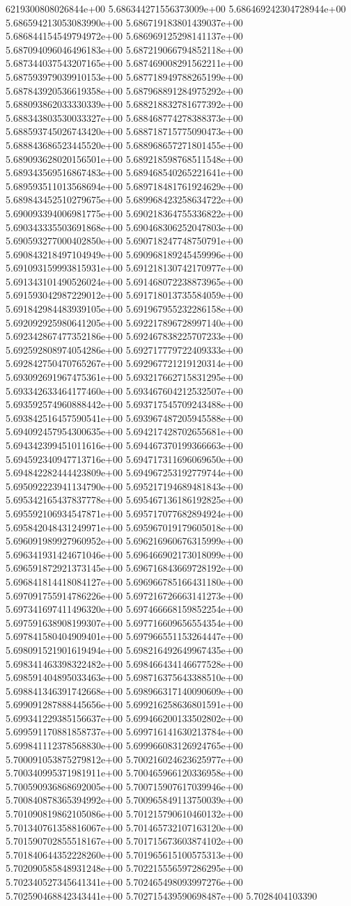 6219300808026844e+00	5.686344271556373009e+00	5.686469242304728944e+00	5.686594213053083990e+00	5.686719183801439037e+00	5.686844154549794972e+00	5.686969125298141137e+00	5.687094096046496183e+00	5.687219066794852118e+00	5.687344037543207165e+00	5.687469008291562211e+00	5.687593979039910153e+00	5.687718949788265199e+00	5.687843920536619358e+00	5.687968891284975292e+00	5.688093862033330339e+00	5.688218832781677392e+00	5.688343803530033327e+00	5.688468774278388373e+00	5.688593745026743420e+00	5.688718715775090473e+00	5.688843686523445520e+00	5.688968657271801455e+00	5.689093628020156501e+00	5.689218598768511548e+00	5.689343569516867483e+00	5.689468540265221641e+00	5.689593511013568694e+00	5.689718481761924629e+00	5.689843452510279675e+00	5.689968423258634722e+00	5.690093394006981775e+00	5.690218364755336822e+00	5.690343335503691868e+00	5.690468306252047803e+00	5.690593277000402850e+00	5.690718247748750791e+00	5.690843218497104949e+00	5.690968189245459996e+00	5.691093159993815931e+00	5.691218130742170977e+00	5.691343101490526024e+00	5.691468072238873965e+00	5.691593042987229012e+00	5.691718013735584059e+00	5.691842984483939105e+00	5.691967955232286158e+00	5.692092925980641205e+00	5.692217896728997140e+00	5.692342867477352186e+00	5.692467838225707233e+00	5.692592808974054286e+00	5.692717779722409333e+00	5.692842750470765267e+00	5.692967721219120314e+00	5.693092691967475361e+00	5.693217662715831295e+00	5.693342633464177460e+00	5.693467604212532507e+00	5.693592574960888442e+00	5.693717545709243488e+00	5.693842516457590541e+00	5.693967487205945588e+00	5.694092457954300635e+00	5.694217428702655681e+00	5.694342399451011616e+00	5.694467370199366663e+00	5.694592340947713716e+00	5.694717311696069650e+00	5.694842282444423809e+00	5.694967253192779744e+00	5.695092223941134790e+00	5.695217194689481843e+00	5.695342165437837778e+00	5.695467136186192825e+00	5.695592106934547871e+00	5.695717077682894924e+00	5.695842048431249971e+00	5.695967019179605018e+00	5.696091989927960952e+00	5.696216960676315999e+00	5.696341931424671046e+00	5.696466902173018099e+00	5.696591872921373145e+00	5.696716843669728192e+00	5.696841814418084127e+00	5.696966785166431180e+00	5.697091755914786226e+00	5.697216726663141273e+00	5.697341697411496320e+00	5.697466668159852254e+00	5.697591638908199307e+00	5.697716609656554354e+00	5.697841580404909401e+00	5.697966551153264447e+00	5.698091521901619494e+00	5.698216492649967435e+00	5.698341463398322482e+00	5.698466434146677528e+00	5.698591404895033463e+00	5.698716375643388510e+00	5.698841346391742668e+00	5.698966317140090609e+00	5.699091287888445656e+00	5.699216258636801591e+00	5.699341229385156637e+00	5.699466200133502802e+00	5.699591170881858737e+00	5.699716141630213784e+00	5.699841112378568830e+00	5.699966083126924765e+00	5.700091053875279812e+00	5.700216024623625977e+00	5.700340995371981911e+00	5.700465966120336958e+00	5.700590936868692005e+00	5.700715907617039946e+00	5.700840878365394992e+00	5.700965849113750039e+00	5.701090819862105086e+00	5.701215790610460132e+00	5.701340761358816067e+00	5.701465732107163120e+00	5.701590702855518167e+00	5.701715673603874102e+00	5.701840644352228260e+00	5.701965615100575313e+00	5.702090585848931248e+00	5.702215556597286295e+00	5.702340527345641341e+00	5.702465498093997276e+00	5.702590468842343441e+00	5.702715439590698487e+00	5.7028404103390